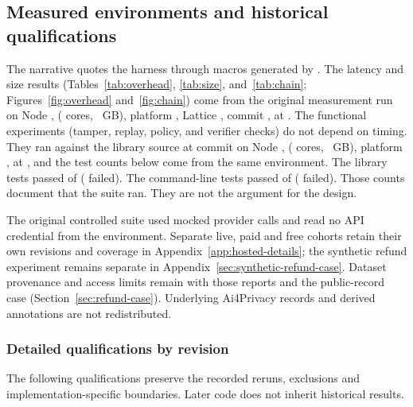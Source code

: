 \subsection{Measured environments and historical qualifications}\label{app:measured-environments}

The narrative quotes the harness through macros generated by . The latency and size results (Tables~\ref{tab:overhead}, \ref{tab:size}, and~\ref{tab:chain}; Figures~\ref{fig:overhead} and~\ref{fig:chain}) come from the original measurement run on Node \EvalNode{}, \EvalCpu{} (\EvalCores{} cores, \EvalMem{}~GB), platform \EvalPlatform{}, Lattice \EvalLatticeVersion{}, commit \texttt{\EvalCommit}, at \EvalDate{}. The functional experiments (tamper, replay, policy, and verifier checks) do not depend on timing. They ran against the library source at commit \texttt{\EvalFuncCommit} on Node \EvalFuncNode{}, \EvalFuncCpu{} (\EvalFuncCores{} cores, \EvalFuncMem{}~GB), platform \EvalFuncPlatform{}, at \EvalFuncDate{}, and the test counts below come from the same environment. The library tests passed \TestsLatticePassed{} of \TestsLatticeTotal{} (\TestsLatticeFailed{} failed). The command-line tests passed \TestsCliPassed{} of \TestsCliTotal{} (\TestsCliFailed{} failed). Those counts document that the suite ran. They are not the argument for the design.

The original controlled suite used mocked provider calls and read no API credential from the environment. Separate live, paid and free cohorts retain their own revisions and coverage in Appendix~\ref{app:hosted-details}; the synthetic refund experiment remains separate in Appendix~\ref{sec:synthetic-refund-case}. Dataset provenance and access limits remain with those reports and the public-record case (Section~\ref{sec:refund-case}). Underlying Ai4Privacy records and derived annotations are not redistributed.

\subsubsection{Detailed qualifications by revision}\label{app:implementation-qualifications}
The following qualifications preserve the recorded reruns, exclusions and implementation-specific boundaries. Later code does not inherit historical results.

